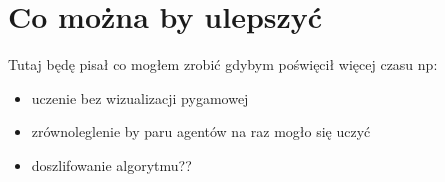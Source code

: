\documentclass[a4paper,12pt,oneside]{book}
\begin{document}
\section{Co można by ulepszyć}
Tutaj będę pisał co mogłem zrobić gdybym poświęcił więcej czasu np:
\begin{itemize}
\item uczenie bez wizualizacji pygamowej
\item zrównoleglenie by paru agentów na raz mogło się uczyć
\item doszlifowanie algorytmu??
\end{itemize}




\end{document}
